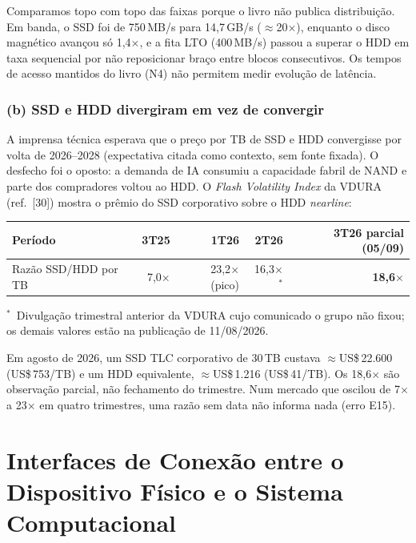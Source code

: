 \documentclass[11pt,a4paper]{article}
\begin{document}
Comparamos topo com topo das faixas porque o livro não publica distribuição. Em banda, o SSD
foi de 750\,MB/s para 14,7\,GB/s ($\approx$20$\times$), enquanto o disco magnético avançou só
1,4$\times$, e a fita LTO (400\,MB/s) passou a superar o HDD em taxa sequencial por não
reposicionar braço entre blocos consecutivos. Os tempos de acesso mantidos do livro (N4) não
permitem medir evolução de latência.

\subsubsection*{(b) SSD e HDD divergiram em vez de convergir}

A imprensa técnica esperava que o preço por TB de SSD e HDD convergisse por volta de
2026--2028 (expectativa citada como contexto, sem fonte fixada). O desfecho foi o oposto: a
demanda de IA consumiu a capacidade fabril de NAND e parte dos compradores voltou ao HDD. O
\emph{Flash Volatility Index} da VDURA (ref.~[30]) mostra o prêmio do SSD corporativo sobre o
HDD \emph{nearline}:

\begin{center}\small
\begin{tabular}{@{}lrrrr@{}}
\toprule
\textbf{Período} & \textbf{3T25} & \textbf{1T26} & \textbf{2T26} & \textbf{3T26 parcial (05/09)} \\
\midrule
Razão SSD/HDD por TB & 7,0$\times$ & 23,2$\times$ (pico) & 16,3$\times$$^{\ast}$ & \textbf{18,6$\times$} \\
\bottomrule
\end{tabular}
\end{center}

{\footnotesize $^{\ast}$~Divulgação trimestral anterior da VDURA cujo comunicado o grupo não
fixou; os demais valores estão na publicação de 11/08/2026.\par}

Em agosto de 2026, um SSD TLC corporativo de 30\,TB custava $\approx$US\$\,22.600
(US\$\,753/TB) e um HDD equivalente, $\approx$US\$\,1.216 (US\$\,41/TB). Os 18,6$\times$ são
observação parcial, não fechamento do trimestre. Num mercado que oscilou de 7$\times$ a
23$\times$ em quatro trimestres, uma razão sem data não informa nada (erro E15).

\section{Interfaces de Conexão entre o Dispositivo Físico e o Sistema Computacional}
\end{document}
